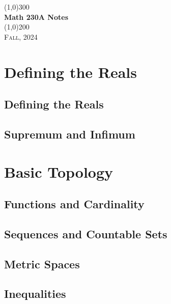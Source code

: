 \documentclass[a4paper, openany]{book}
\begin{document}
\begin{titlepage}
    \begin{center}
        \line(1,0){300} \\
        [0.25in]
        \huge{\bfseries Math 230A Notes} \\
        [2mm]
        \line(1,0){200} \\
        [1.5cm]
        \textsc{\LARGE Fall, 2024}
    \end{center}
\end{titlepage}

\tableofcontents
\setcounter{section}{0}

\chapter{Defining the Reals}
\section{Defining the Reals}

\newpage

\section{Supremum and Infimum}

\newpage

\chapter{Basic Topology}
\section{Functions and Cardinality}

\newpage

\section{Sequences and Countable Sets}

\newpage

\section{Metric Spaces}

\newpage

\section{Inequalities}

\newpage
\end{document}
